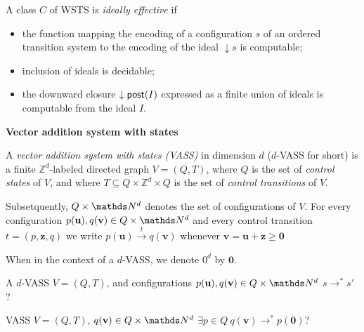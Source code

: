\fi


\begin{definition}{\cite{BFM-ic17}} 
A class $C$ of WSTS is {\em ideally effective} if
\begin{itemize}
\item the function mapping the encoding of a configuration $s$ of an ordered transition system
to the encoding of the ideal $\downarrow s$ is computable;
\item inclusion of ideals is decidable;
\item the downward closure $\downarrow \textsf{post}(I)$ expressed as a finite union of ideals is computable from the ideal $I$.
\end{itemize}
\end{definition}



\noindent
{\bf Vector addition system with states}


\begin{definition}
A {\em vector addition system with states (VASS)} in dimension $d$ ($d$-VASS for short) is a finite $\mathds{Z}^d$-labeled directed graph $V = (Q,T)$, where $Q$ is the set of {\em control states} of $V$, and where $T \subseteq Q \times \mathds{Z}^d \times Q$ is the set of {\em control transitions} of $V$. 
\end{definition}

Subsetquently, $Q \times \N^d$ denotes the set of configurations of $V$.
For every configuration $p(\textbf{u}), q(\textbf{v}) \in Q \times \N^d$ and every control transition $t = (p, \textbf{z}, q)$ we write $p(\textbf{u}) \xrightarrow{t} q(\textbf{v})$ whenever $\textbf{v} = \textbf{u} + \textbf{z} \geq \textbf{0}$


When in the context of a $d$-VASS, we denote $0^d$ by $\textbf{0}$.



{A $d$-VASS $V=(Q,T)$, and configurations $p(\textbf{u}), q(\textbf{v}) \in Q \times \N^d$}
{$s \to^* s'$ ? \\}


{VASS $V=(Q,T)$, $q(\textbf{v}) \in Q \times \N^d$}
{$\exists p \in Q ~ q(\textbf{v}) \to^* p(\textbf{0})$? \\} 







